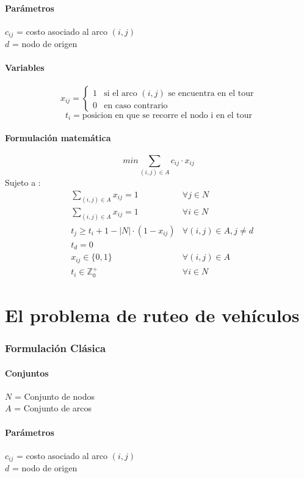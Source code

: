 \documentclass{article}
\numberwithin{equation}{section}
\begin{document}
\subsection{Parámetros}
$c_{ij}$ = costo asociado al arco $(i,j)$\\
$d$ = nodo de origen
\subsection{Variables}
\begin{flushleft}
\[x_{ij}={\begin{cases}1&{\mbox{si el arco $(i,j)$ se encuentra en el tour}}\\0&{\mbox{en caso contrario}}\end{cases}}
\]
\[t_{i} = \mbox{posicion en que se recorre el nodo i en el tour}\]
\end{flushleft}
\subsection{Formulación matemática}
\begin{equation}
min \sum_{(i,j) \in A} c_{ij} \cdot x_{ij}
\end{equation}
Sujeto a : \begin{align}
& \sum_{(i,j) \in A} x_{ij} = 1 &\forall j \in N \\
& \sum_{(i,j) \in A} x_{ij} = 1 &\forall i \in N \\
& t_{j} \geq t_{i} + 1 - |N| \cdot (1 - x_{ij}) & \forall (i,j) \in A, j \neq d\\
& t_{d} = 0\\
& x_{ij} \in \{0,1\} &\forall (i,j) \in A\\
& t_{i} \in \mathbb{Z}^{+}_{0} &\forall i \in N
\end{align}

\newpage
\part{El problema de ruteo de vehículos}
\section{Formulación Clásica}
\subsection{Conjuntos}
$N$ = Conjunto de nodos\\
$A$ = Conjunto de arcos
\subsection{Parámetros}
$c_{ij}$ = costo asociado al arco $(i,j)$\\
$d$ = nodo de origen
\end{document}
